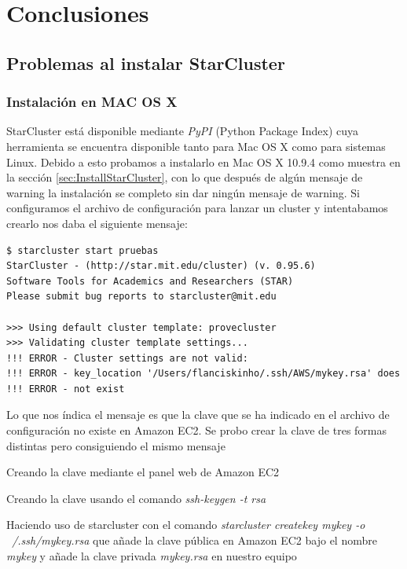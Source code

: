 \documentclass{article}
\begin{document}
\clearpage
\section{Conclusiones}\label{sec:Conclusion}

\subsection{Problemas al instalar StarCluster}

\subsubsection{Instalación en MAC OS X}
	StarCluster está disponible mediante \emph{PyPI} (Python Package Index) cuya herramienta se encuentra disponible tanto para Mac OS X como para sistemas Linux. Debido a esto probamos a instalarlo en Mac OS X 10.9.4 como muestra en la sección \ref{sec:InstallStarCluster}, con lo que después de algún mensaje de warning la instalación se completo sin dar ningún mensaje de warning. Si configuramos el archivo de configuración para lanzar un cluster y intentabamos crearlo nos daba el siguiente mensaje:
\begin{lstlisting}[style=miniBash]
$ starcluster start pruebas
StarCluster - (http://star.mit.edu/cluster) (v. 0.95.6)
Software Tools for Academics and Researchers (STAR)
Please submit bug reports to starcluster@mit.edu

>>> Using default cluster template: provecluster
>>> Validating cluster template settings...
!!! ERROR - Cluster settings are not valid:
!!! ERROR - key_location '/Users/flanciskinho/.ssh/AWS/mykey.rsa' does
!!! ERROR - not exist
\end{lstlisting}
Lo que nos índica el mensaje es que la clave que se ha indicado en el archivo de configuración no existe en Amazon EC2. Se probo crear la clave de tres formas distintas pero consiguiendo el mismo mensaje
{\setlength{\parskip}{0mm}\begin{enumerate}
{\setlength{\parskip}{0mm}
	\item Creando la clave mediante el panel web de Amazon EC2
	\item Creando la clave usando el comando \emph{ssh-keygen -t rsa}
	\item Haciendo uso de starcluster con el comando \emph{starcluster createkey mykey -o ~/.ssh/mykey.rsa} que añade la clave pública en Amazon EC2 bajo el nombre \emph{mykey} y añade la clave privada \emph{mykey.rsa} en nuestro equipo
}
\end{enumerate}}
\end{document}
